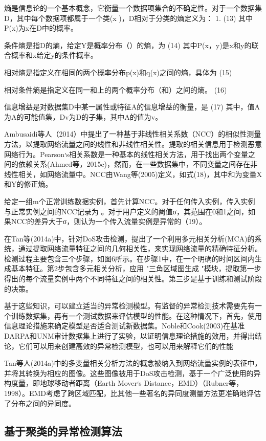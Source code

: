 熵是信息论的一个基本概念，它衡量一个数据项集合的不确定性。对于一个数据集D，其中每个数据项都属于一个类(x )，D相对于分类的熵定义为： 1.
(13)
其中P(x)为x在D中的概率。


条件熵是指D的熵，给定Y是概率分布（）的熵，为
(14)
其中P(x，y)是x和y的联合概率和x给定y的条件概率。


相对熵是指定义在相同的两个概率分布p(x)和q(x)之间的熵，具体为
(15)

相对条件熵是指定义在同一和上的两个概率分布（和）之间的熵。
(16)

信息增益是对数据集D中某一属性或特征A的信息增益的衡量，是
(17)
其中，值A为A的可能值集，Dv为D的子集，其中A的值为v。


Ambusaidi等人（2014）中提出了一种基于非线性相关系数（NCC）的相似性测量方法，以提取网络流量之间的线性和非线性相关性。提取的相关信息用于检测恶意网络行为。Pearson׳s相关系数是一种基本的线性相关方法，用于找出两个变量之间的依赖关系(Ahmed等，2015c)，然而，在一些数据集中，不同变量之间存在非线性相关，如网络流量中。NCC由Wang等(2005)定义，如式(18)，其中和为变量X和Y的修正熵。

给定一组m个正常训练数据实例，首先计算NCC。对于任何传入实例，传入实例与正常实例之间的NCC记录为 。对于用户定义的阈值σ，其范围在0和1之间，如果NCC的差异大于σ，则认为一个传入流量实例是异常的（19）。


在Tan等(2014a)中，针对DoS攻击检测，提出了一个利用多元相关分析(MCA)的系统，通过提取网络流量特征之间的几何相关性，来实现网络流量的精确特征分析。检测过程主要包含三个步骤，如图6所示。在步骤1中，在一个明确的时间区间内生成基本特征。第2步包含多元相关分析，应用 "三角区域图生成 "模块，提取第一步得出的每个流量实例中两个不同特征之间的相关性。第三步是基于训练和测试阶段的决策。


基于这些知识，可以建立适当的异常检测模型。有监督的异常检测技术需要先有一个训练数据集，再有一个测试数据来评估模型的性能。在这种情况下，首先，使用信息理论措施来确定模型是否适合测试新数据集。Noble和Cook(2003)在基准DARPA和UNM审计数据集上进行了实验，以证明信息理论措施的效用，并得出结论，它们可以用来创建高效的异常检测模型，也可以用来解释它们的性能

Tan等人(2014a)中的多变量相关分析方法的概念被纳入到网络流量实例的表征中，并将其转换为相应的图像。这些图像被用于DoS攻击检测，基于一个广泛使用的异构度量，即地球移动者距离（Earth Mover׳s Distance，EMD）（Rubner等，1998）。EMD考虑了跨区域匹配，比其他一些著名的异同度测量方法更准确地评估了分布之间的异同度。

\subsection{基于聚类的异常检测算法}

